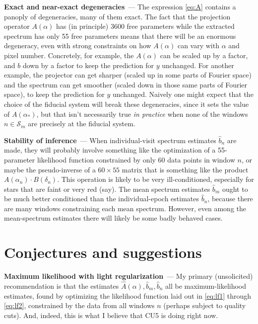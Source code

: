 \documentclass[11pt]{article}
\renewcommand{\paragraph}[1]{\medskip\par\noindent\textbf{#1}~---}
\begin{document}
\paragraph{Exact and near-exact degeneracies}
The expression \eqref{eq:A} contains a panoply of degeneracies, many of them exact.
The fact that the projection operator $A(\alpha)$ has (in principle) 3600 free parameters while the extracted spectrum has only 55 free parameters means that there will be an enormous degeneracy, even with strong constraints on how $A(\alpha)$ can vary with $\alpha$ and pixel number.
Concretely, for example, the $A(\alpha)$ can be scaled up by a factor, and $b$ down by a factor to keep the prediction for $y$ unchanged.
For another example, the projector can get sharper (scaled up in some parts of Fourier space) and the spectrum can get smoother (scaled down in those same parts of Fourier space), to keep the prediction for $y$ unchanged.
Naively one might expect that the choice of the fiducial system will break these degeneracies, since it sets the value of $A(\alpha_\ast)$, but that isn't necessarily true \emph{in practice} when none of the windows $n\in\mathscr{S}_m$ are precisely at the fiducial system.

\paragraph{Stability of inference}
When individual-visit spectrum estimates $\hat{b}_n$ are made, they will probably involve something like the optimization of a 55-parameter likelihood function constrained by only 60 data points in window $n$, or maybe the pseudo-inverse of a $60\times 55$ matrix that is something like the product $A(\alpha_n)\cdot B(\delta_n)$.
This operation is likely to be very ill-conditioned, especially for stars that are faint or very red (say).
The mean spectrum estimates $\hat{b}_m$ ought to be much better conditioned than the individual-epoch estimates $\hat{b}_n$, because there are many windows constraining each mean spectrum.
However, even among the mean-spectrum estimates there will likely be some badly behaved cases.

\section{Conjectures and suggestions}

\paragraph{Maximum likelihood with light regularization}
My primary (unsolicited) recommendation is that the estimates $\hat{A}(\alpha), \hat{b}_m, \hat{b}_n$ all be maximum-likelihood estimates, found by optimizing the likelihood function laid out in \eqref{eq:lf1} through \eqref{eq:lf2}, constrained by the data from all windows $n$ (perhaps subject to quality cuts).
And, indeed, this is what I believe that CU5 is doing right now.
\end{document}
